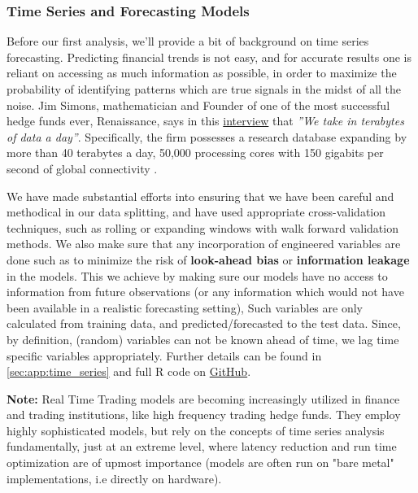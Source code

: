 \documentclass[12pt, twoside,hidelinks]{article}
\theoremstyle{definition}
\numberwithin{equation}{section}
\begin{document}
\subsubsection{Time Series and Forecasting Models}
Before our first analysis, we'll provide a bit of background on time series forecasting. Predicting financial trends is not easy, and for accurate results one is reliant on accessing as much information as possible, in order to maximize the probability of identifying patterns which are true signals in the midst of all the noise. Jim Simons, mathematician and Founder of one of the most successful hedge funds ever, Renaissance, says in this \href{https://english-online.hr/materials/42d8c0fe0de3cd0}{interview} that \textit{''We take in terabytes of data a day''}. Specifically, the firm possesses a research database expanding by more than 40 terabytes a day, 50,000 processing cores with 150 gigabits per second of global connectivity \citep{RenaissanceTech2024}.
\newline

We have made substantial efforts into ensuring that we have been careful and methodical in our data splitting, and have used appropriate cross-validation techniques, such as rolling or expanding windows with walk forward validation methods. We also make sure that any incorporation of engineered variables are done such as to minimize the risk of \textbf{look-ahead bias} or \textbf{information leakage} in the models. This we achieve by making sure our models have no access to information from future observations (or any information which would not have been available in a realistic forecasting setting), Such variables are only calculated from training data, and predicted/forecasted to the test data. Since, by definition, (random) variables can not be known ahead of time, we lag time specific variables appropriately. Further details can be found in \ref{sec:app:time_series} and full R code on \href{https://github.com/AllInCade/MasterProject}{GitHub}.
\newline

\textbf{Note:} Real Time Trading models are becoming increasingly utilized in finance and trading institutions, like high frequency trading hedge funds. They employ highly sophisticated models, but rely on the concepts of time series analysis fundamentally, just at an extreme level, where latency reduction and run time optimization are of upmost importance (models are often run on "bare metal"  implementations, i.e directly on hardware). 
\end{document}
